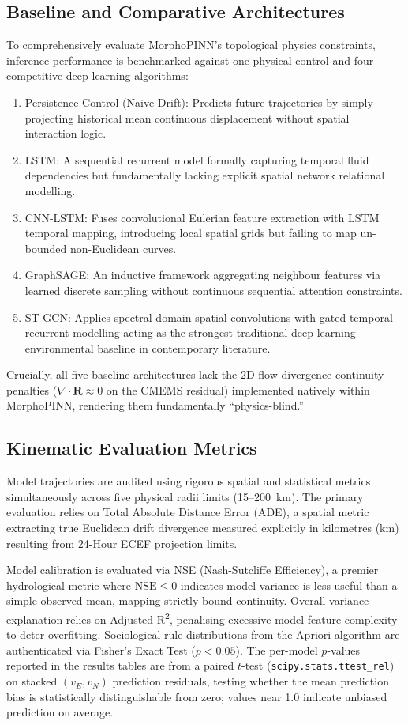 \documentclass[conference]{IEEEtran}
\begin{document}
\subsection{Baseline and Comparative Architectures}
To comprehensively evaluate MorphoPINN's topological physics constraints, inference performance is benchmarked against one physical control and four competitive deep learning algorithms:
\begin{enumerate}
    \item Persistence Control (Naive Drift): Predicts future trajectories by simply projecting historical mean continuous displacement without spatial interaction logic.
    \item LSTM: A sequential recurrent model formally capturing temporal fluid dependencies but fundamentally lacking explicit spatial network relational modelling.
    \item CNN-LSTM: Fuses convolutional Eulerian feature extraction with LSTM temporal mapping, introducing local spatial grids but failing to map un-bounded non-Euclidean curves.
    \item GraphSAGE: An inductive framework aggregating neighbour features via learned discrete sampling without continuous sequential attention constraints.
    \item ST-GCN: Applies spectral-domain spatial convolutions with gated temporal recurrent modelling acting as the strongest traditional deep-learning environmental baseline in contemporary literature.
\end{enumerate}
Crucially, all five baseline architectures lack the 2D flow divergence continuity penalties ($\nabla \cdot \mathbf{R} \approx 0$ on the CMEMS residual) implemented natively within MorphoPINN, rendering them fundamentally ``physics-blind.''

\subsection{Kinematic Evaluation Metrics}
Model trajectories are audited using rigorous spatial and statistical metrics simultaneously across five physical radii limits (15--200~km). The primary evaluation relies on Total Absolute Distance Error (ADE), a spatial metric extracting true Euclidean drift divergence measured explicitly in kilometres (km) resulting from 24-Hour ECEF projection limits.

Model calibration is evaluated via NSE (Nash-Sutcliffe Efficiency), a premier hydrological metric where $\text{NSE} \le 0$ indicates model variance is less useful than a simple observed mean, mapping strictly bound continuity. Overall variance explanation relies on Adjusted R\textsuperscript{2}, penalising excessive model feature complexity to deter overfitting. Sociological rule distributions from the Apriori algorithm are authenticated via Fisher's Exact Test ($p < 0.05$). The per-model $p$-values reported in the results tables are from a paired $t$-test (\texttt{scipy.stats.ttest\_rel}) on stacked $(v_E, v_N)$ prediction residuals, testing whether the mean prediction bias is statistically distinguishable from zero; values near 1.0 indicate unbiased prediction on average.
\end{document}
